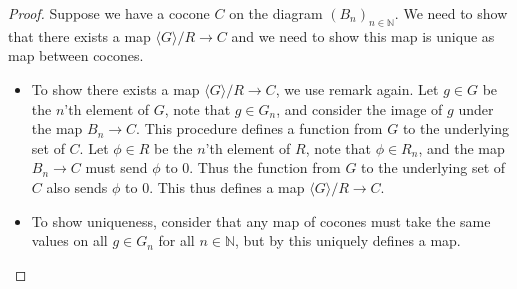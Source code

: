 \begin{proof}
  Suppose we have a cocone $C$ on the diagram $(B_n)_{n\in\mathbb N}$. 
  We need to show that there exists a map $\langle G \rangle / R\to C$ and
  we need to show this map is unique as map between cocones. 
  \begin{itemize}
    \item To show there exists a map $\langle G \rangle / R \to C$, 
      we use remark  again. 
      Let $g\in G$ be the $n$'th element of $G$, 
      note that $g\in G_n$, and consider the image of $g$ under the map $B_n \to C$. 
      This procedure defines a function from $G$ to the underlying set of $C$. 
      Let $\phi \in R$ be the $n$'th element of $R$, 
      note that $\phi \in R_n$, and the map $B_n \to C$ must send $\phi$ to $0$. 
      Thus the function from $G$ to the underlying set of $C$ also sends $\phi$ to $0$. 
      This thus defines a map $\langle G \rangle / R \to C$. 
    \item To show uniqueness, consider that any map of cocones must take the same values 
      on all $g\in G_n$ for all $n\in\mathbb N$, but by 
      this uniquely defines a map. 
  \end{itemize}
%
%
%
%
%
%
%
\end{proof} 









